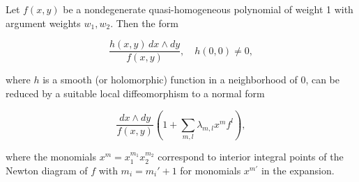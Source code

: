 Let $f(x, y)$ be a nondegenerate quasi-homogeneous polynomial of weight 1 with argument weights $w_1, w_2$. Then the form

$$\frac{h(x, y) \, dx \wedge dy}{f(x, y)}, \quad h(0, 0) \neq 0,$$

where $h$ is a smooth (or holomorphic) function in a neighborhood of 0, can be reduced by a suitable local diffeomorphism to a normal form

$$\frac{dx \wedge dy}{f(x, y)} \left(1 + \sum_{m,l} \lambda_{m,l} x^m f^l\right),$$

where the monomials $x^m = x_1^{m_1} x_2^{m_2}$ correspond to interior integral points of the Newton diagram of $f$ with $m_i = m_i' + 1$ for monomials $x^{m'}$ in the expansion.
